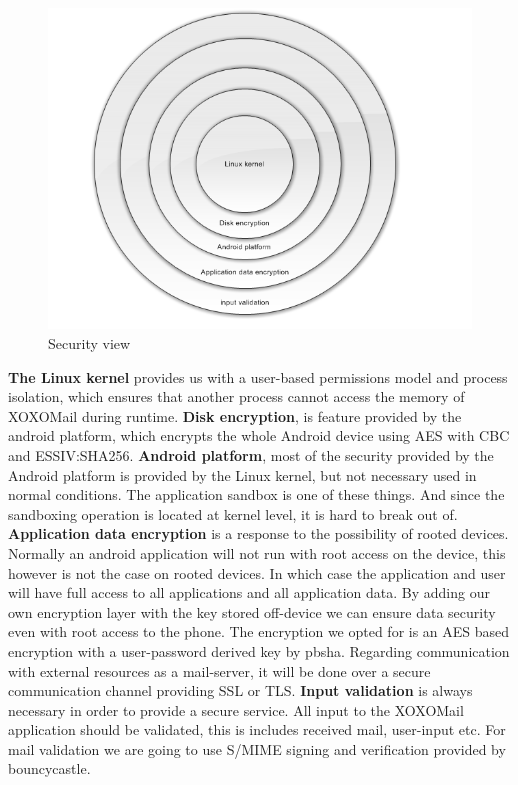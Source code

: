 \begin{figure}
	\includegraphics[width=\textwidth]{securityview.png}
	\caption{Security view}
	\label{fig:securityview}
\end{figure} \hfill
\newline
\newline
\textbf{The Linux kernel} provides us with a user-based permissions model and process isolation, which ensures that another process cannot access the memory of XOXOMail during runtime.
\newline
\newline
\textbf{Disk encryption}, is feature provided by the android platform, which encrypts the whole Android device using AES with CBC and ESSIV:SHA256.\cite{bib:crypto}
\newline
\newline
\textbf{Android platform}, most of the security provided by the Android platform is provided by the Linux kernel, but not necessary used in normal conditions. The application sandbox is one of these things. And since the sandboxing operation is located at kernel level, it is hard to break out of. 
\newline
\newline
\textbf{Application data encryption} is a response to the possibility of rooted devices. Normally an android application will not run with root access on the device, this however is not the case on rooted devices. In which case the application and user will have full access to all applications and all application data. By adding our own encryption layer with the key stored off-device we can ensure data security even with root access to the phone\cite{bib:tech}. The encryption we opted for is an AES based encryption with a user-password derived key by \gls{pbsha}.
Regarding communication with external resources as a mail-server, it will be done over a secure communication channel providing SSL or TLS. 
\newline
\newline
\textbf{Input validation} is always necessary in order to provide a secure service. All input to the XOXOMail application should be validated, this is includes received mail, user-input etc. For mail validation we are going to use S/MIME signing and verification provided by bouncycastle. 

